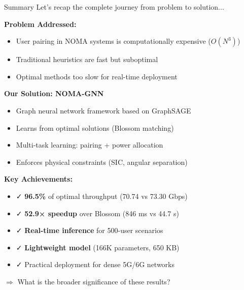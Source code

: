 \documentclass[aspectratio=169]{beamer}
\begin{document}
\begin{frame}{Summary}
    \vspace{-0.2cm}
    \small \textcolor{iiitblue}{Let's recap the complete journey from problem to solution...}
    
    \vspace{0.2cm}
    
    \textbf{Problem Addressed:}
    \begin{itemize}
        \item User pairing in NOMA systems is computationally expensive ($O(N^3)$)
        \item Traditional heuristics are fast but suboptimal
        \item Optimal methods too slow for real-time deployment
    \end{itemize}
    
    \vspace{0.3cm}
    
    \textbf{Our Solution: NOMA-GNN}
    \begin{itemize}
        \item Graph neural network framework based on GraphSAGE
        \item Learns from optimal solutions (Blossom matching)
        \item Multi-task learning: pairing + power allocation
        \item Enforces physical constraints (SIC, angular separation)
    \end{itemize}
    
    \vspace{0.3cm}
    
    \textbf{Key Achievements:}
    \begin{itemize}
        \item ✓ \textbf{96.5\%} of optimal throughput (70.74 vs 73.30 Gbps)
        \item ✓ \textbf{52.9× speedup} over Blossom (846 ms vs 44.7 s)
        \item ✓ \textbf{Real-time inference} for 500-user scenarios
        \item ✓ \textbf{Lightweight model} (166K parameters, 650 KB)
        \item ✓ Practical deployment for dense 5G/6G networks
    \end{itemize}
    
    \vspace{0.2cm}
    \small \textcolor{iiitblue}{$\Rightarrow$ What is the broader significance of these results?}
\end{frame}
\end{document}
